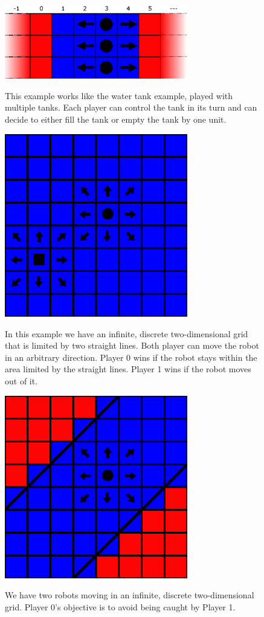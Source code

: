\documentclass[10pt,a4paper]{article}
\theoremstyle{plain}
\theoremstyle{definition}
\begin{document}
\begin{figure}
  \caption{This example works like the water tank example, played with multiple tanks. Each player can control the tank in its turn and can decide to either fill the tank or empty the tank by one unit.}
  \centering
    {\includegraphics[width=8.0cm]{multi_wasser_tank.png}} 
\end{figure}






\begin{figure}
  \caption{In this example we have an infinite, discrete two-dimensional grid that is limited by two straight lines. Both player can move the robot in an arbitrary direction. Player 0 wins if the robot stays within the area limited by the straight lines. Player 1 wins if the robot moves out of it.}
  \centering
    {\includegraphics[width=8.0cm]{catch.png}} 
\end{figure}

\begin{figure}
  \caption{We have two robots moving in an infinite, discrete two-dimensional grid. Player 0's objective is to avoid being caught by Player 1.
}
  \centering
    {\includegraphics[width=8.0cm]{zwei_geraden.png}} 
\end{figure}
\end{document}
